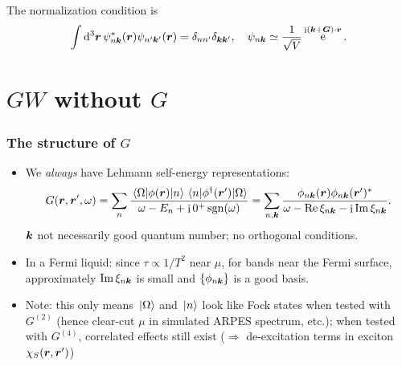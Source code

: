 \documentclass[t]{beamer}
\DeclareMathOperator{\ee}{e}
\DeclareMathOperator{\ii}{i}
\DeclareMathOperator{\sgn}{sgn}
\begin{document}
\begin{frame}[allowframebreaks]
\begin{itemize}
        The normalization condition is 
        \begin{equation}
            \int \dd[3]{\vb*{r}} \psi^*_{n \vb*{k}} (\vb*{r}) \psi_{n' \vb*{k}'}(\vb*{r})
            = \delta_{n n'} \delta_{\vb*{k} \vb*{k}'}, \quad 
            \psi_{n \vb*{k}} \simeq \frac{1}{\sqrt{V}} \ee^{\ii (\vb*{k} + \vb*{G}) \cdot \vb*{r}}.
        \end{equation}
\end{itemize}

\end{frame}

\section{$GW$ without $G$}

\begin{frame}
\frametitle{The structure of $G$}

\begin{itemize}
    \item We \emph{always} have Lehmann self-energy representations:
    \begin{equation}
        G(\vb*{r}, \vb*{r}', \omega) = \sum_n \frac{
            \mel{\Omega}{\phi(\vb*{r})}{n} \mel{n}{\phi^\dagger(\vb*{r}')}{\Omega}
        }{
            \omega - E_n + \ii 0^+ \sgn(\omega)
        }  
        = \sum_{n, \vb*{k}} 
        \frac{\phi_{n \vb*{k}}(\vb*{r}) \phi_{n \vb*{k}}(\vb*{r}')^*}{
            \omega - \Re \xi_{n \vb*{k}} - \ii \Im \xi_{n \vb*{k}}
        }.
    \end{equation}
    $\vb*{k}$ not necessarily good quantum number; 
    no orthogonal conditions. 
    \item In a Fermi liquid: since $\tau \propto 1 / T^2$ near $\mu$, 
    for bands near the Fermi surface, 
    approximately $\Im \xi_{n \vb*{k}}$ is small and $\{\phi_{n \vb*{k}}\}$ is a good basis. 
    \item Note: this only means $\ket*{\Omega}$ and $\ket*{n}$ look like 
        Fock states when tested with $G^{(2)}$ 
        (hence clear-cut $\mu$ in simulated ARPES spectrum, etc.); 
        when tested with $G^{(4)}$, correlated effects still exist 
        ($\Rightarrow$ de-excitation terms in exciton $\chi_S(\vb*{r}, \vb*{r}')$) 
\end{itemize}

\end{frame}
\end{document}
